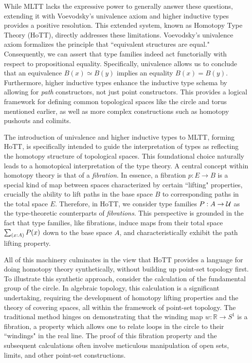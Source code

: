 \documentclass[main.tex]{subfiles}
\begin{document}
While MLTT lacks the expressive power to generally answer these questions, extending it with Voevodsky's univalence axiom and higher inductive types provides a positive resolution. This extended system, known as Homotopy Type Theory (HoTT), directly addresses these limitations. Voevodsky's univalence axiom formalizes the principle that ``equivalent structures are equal." Consequently, we can assert that type families indeed act functorially with respect to propositional equality. Specifically, univalence allows us to conclude that an equivalence $B(x) \simeq B(y)$ implies an equality $B(x) = B(y)$. Furthermore, higher inductive types enhance the inductive type schema by allowing for \textit{path} constructors, not just point constructors. This provides a logical framework for defining common topological spaces like the circle and torus mentioned earlier, as well as more complex constructions such as homotopy pushouts and colimits.

The introduction of univalence and higher inductive types to MLTT, forming HoTT, is specifically intended to guide the interpretation of types as reflecting the homotopy structure of topological spaces. This foundational choice naturally leads to a homotopical interpretation of the type theory. A central concept within homotopy theory is that of a \textit{fibration}. In essence, a fibration $p : E \to B$ is a special kind of map between spaces characterized by certain ``lifting" properties, crucially the ability to lift paths in the base space $B$ to corresponding paths in the total space $E$. Therefore, in HoTT, we consider type families $P : A \to \mathcal{U}$ as the type-theoretic counterparts of \textit{fibrations}. This perspective is grounded in the fact that type families, like fibrations, induce maps from their total space $\sm{x:A}P(x)$ down to the base space $A$, and characteristically exhibit the path lifting property.

All of this machinery culminates in the view that HoTT provides a language for doing homotopy theory synthetically, without building up point-set topology first. To illustrate this synthetic approach, consider the calculation of the fundamental group of the circle. In algebraic topology, this calculation is a significant undertaking, requiring the development of homotopy lifting properties and the theory of covering spaces, all within the framework of point-set topology. The traditional method hinges on demonstrating that the winding map  $w : \mathbb{R} \to S^1$ is a fibration, a property which allows one to relate loops in the circle to their ``windings" in the real line. The proof of this fibration property and the subsequent calculations often involve meticulous manipulation of open sets, limits, and other point-set constructions.
\end{document}
